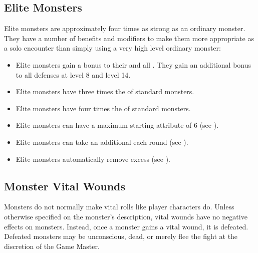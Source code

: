   \subsection{Elite Monsters}\label{Elite Monsters}
    Elite monsters are approximately four times as strong as an ordinary monster.
    They have a number of benefits and modifiers to make them more appropriate as a solo encounter than simply using a very high level ordinary monster:
    \begin{itemize}
      \item Elite monsters gain a  bonus to their  and all . They gain an additional  bonus to all defenses at level 8 and level 14.
      \item Elite monsters have three times the  of standard monsters.
      \item Elite monsters have four times the  of standard monsters.
      \item Elite monsters can have a maximum starting attribute of 6 (see ).
      \item Elite monsters can take an additional  each round (see ).
      \item Elite monsters automatically remove excess  (see ).
    \end{itemize}

  \subsection{Monster Vital Wounds}
    Monsters do not normally make vital rolls like player characters do.
    Unless otherwise specified on the monster's description, vital wounds have no negative effects on monsters.
    Instead, once a monster gains a vital wound, it is defeated.
    Defeated monsters may be unconscious, dead, or merely flee the fight at the discretion of the Game Master.

